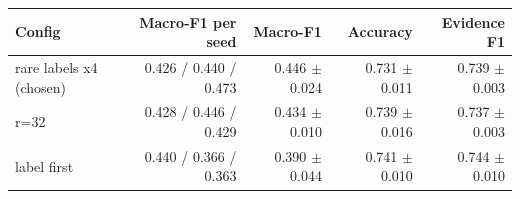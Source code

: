 \begin{tabular}{lrrrr}
\toprule
Config & Macro-F1 per seed & Macro-F1 & Accuracy & Evidence F1 \\
\midrule
rare labels x4 (chosen) & 0.426 / 0.440 / 0.473 & 0.446 $\pm$ 0.024 & 0.731 $\pm$ 0.011 & 0.739 $\pm$ 0.003 \\
r=32 & 0.428 / 0.446 / 0.429 & 0.434 $\pm$ 0.010 & 0.739 $\pm$ 0.016 & 0.737 $\pm$ 0.003 \\
label first & 0.440 / 0.366 / 0.363 & 0.390 $\pm$ 0.044 & 0.741 $\pm$ 0.010 & 0.744 $\pm$ 0.010 \\
\bottomrule
\end{tabular}
